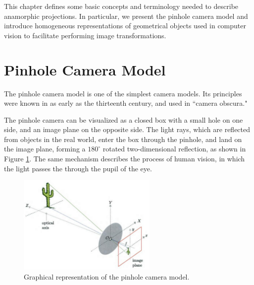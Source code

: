 \documentclass[11pt, oneside, reqno]{book}
\begin{document}
This chapter defines some basic concepts and terminology needed to describe anamorphic projections. In particular, we present the pinhole camera model and introduce homogeneous representations of geometrical objects used in computer vision to facilitate performing image transformations.


%
%







\section{Pinhole Camera Model}

The pinhole camera model is one of the simplest camera models. Its principles were known in as early as the thirteenth century, and used in ``camera obscura."~\cite{burger2009digital}

The pinhole camera can be visualized as a closed box with a small hole on one side, and an image plane on the opposite side. The light rays, which are reflected from objects in the real world, enter the box through the pinhole, and land on the image plane, forming a $180^{\circ}$ rotated two-dimensional reflection, as shown in Figure \ref{fig:pinhole}. The same mechanism describes the process of human vision, in which the light passes the through the pupil of the eye.

\begin{figure}[t]
	\centering
	\includegraphics[width=0.6\textwidth]{data/pinhole_camera/pinhole_big}
	\caption{Graphical representation of the pinhole camera model.~\cite{burger2009digital}}
	\label{fig:pinhole}
\end{figure}
\end{document}
